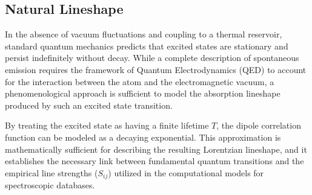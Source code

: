 \documentclass[8pt,a4paper]{report}
\begin{document}
	
	\subsection{Natural Lineshape}
	In the absence of vacuum fluctuations and coupling to a thermal reservoir, standard quantum mechanics predicts that excited states are stationary and persist indefinitely without decay. While a complete description of spontaneous emission requires the framework of Quantum Electrodynamics (QED) to account for the interaction between the atom and the electromagnetic vacuum, a phenomenological approach is sufficient to model the absorption lineshape produced by such an excited state transition.
	
	By treating the excited state as having a finite lifetime $T$, the dipole correlation function can be modeled as a decaying exponential. This approximation is mathematically sufficient for describing the resulting Lorentzian lineshape, and it establishes the necessary link between fundamental quantum transitions and the empirical line strengths ($S_{ij}$) utilized in the computational models for spectroscopic databases.
	
\end{document}
